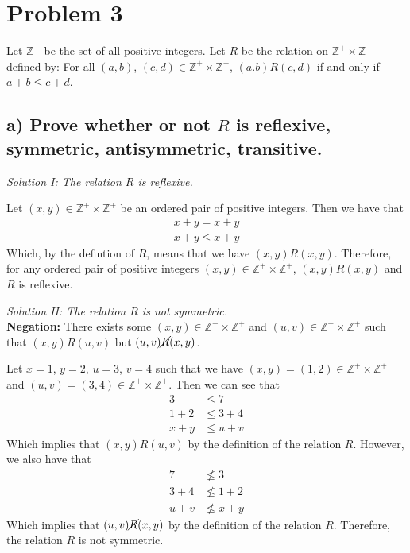 \documentclass[11pt, letterpaper]{article}
\begin{document}
\section*{Problem 3}
{\large Let $\mathbb{Z^+}$ be the set of all positive integers. Let $R$ be the relation on $\mathbb{Z^+}\times \mathbb{Z^+}$ defined by: For all $(a,b)$, $(c,d)\in\mathbb{Z^+}\times\mathbb{Z^+}$, $(a.b)R(c,d)$ if and only if $a+b\leq c+d$.}
\subsection*{a) Prove whether or not $R$ is reflexive, symmetric, antisymmetric, transitive.}
{\large\it Solution I: The relation $R$ is reflexive.}
\begin{prf}
    Let $(x,y)\in\mathbb{Z^+}\times\mathbb{Z^+}$ be an ordered pair of positive integers. Then we have that
    \begin{align*}
        x+y=x+y\\
        x+y\leq x+y
    \end{align*}
    Which, by the defintion of $R$, means that we have $(x,y)R(x,y)$. Therefore, for any ordered pair of positive integers $(x,y)\in\mathbb{Z^+}\times\mathbb{Z^+}$, $(x,y)R(x,y)$ and $R$ is reflexive.
\end{prf}
{\noindent\large\it Solution II: The relation $R$ is not symmetric.}\\[0.25cm]
{\bf Negation:} There exists some $(x,y)\in\mathbb{Z^+}\times\mathbb{Z^+}$ and $(u,v)\in\mathbb{Z^+}\times\mathbb{Z^+}$ such that $(x,y)R(u,v)$ but $(u,v)\cancel{R}(x,y)$.
\begin{prf}
    Let $x=1$, $y=2$, $u=3$, $v=4$ such that we have $(x,y)=(1,2)\in\mathbb{Z^+}\times\mathbb{Z^+}$ and $(u,v)=(3,4)\in\mathbb{Z^+}\times\mathbb{Z^+}$. Then we can see that
    \begin{align*}
        3&\leq 7\\
        1+2&\leq 3+4\\
        x+y&\leq u+v
    \end{align*}
    Which implies that $(x,y)R(u,v)$ by the definition of the relation $R$. However, we also have that
    \begin{align*}
        7&\nleq 3\\
        3+4&\nleq 1+2\\
        u+v&\nleq x+y
    \end{align*}
    Which implies that $(u,v)\cancel{R}(x,y)$ by the definition of the relation $R$. Therefore, the relation $R$ is not symmetric. 
\end{prf}
\end{document}
